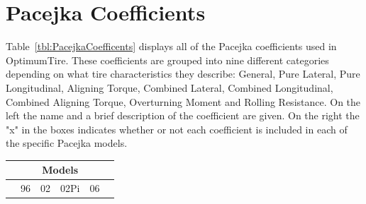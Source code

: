 \section{Pacejka Coefficients}
\label{sec:PacejkaCoefficients}
Table~\ref{tbl:PacejkaCoefficents} displays all of the Pacejka coefficients used in OptimumTire. These coefficients are grouped into nine different categories depending on what tire characteristics they describe: General, Pure Lateral, Pure Longitudinal, Aligning Torque, Combined Lateral, Combined Longitudinal, Combined Aligning Torque, Overturning Moment and Rolling Resistance. 
On the left the name and a brief description of the coefficient are given. On the right the "x" in the boxes indicates whether or not each coefficient is included in each of the specific Pacejka models.

\begin{center}
\begin{longtable}[c]{|c|p{4in}|cccc|}
\hline
			\rowcolor{tblue}\multicolumn{2}{c}{\cellcolor{tblue}\textbf{Pacejka Coefficents}}&\multicolumn{4}{c}{\cellcolor{tblue}\textbf{Models}}\\\hline
			
			\rowcolor{ttblue}\multicolumn{2}{c}{\cellcolor{ttblue}\textbf{General}}&96&02&02Pi&06\\\hline
			

\end{longtable}
\end{center}
